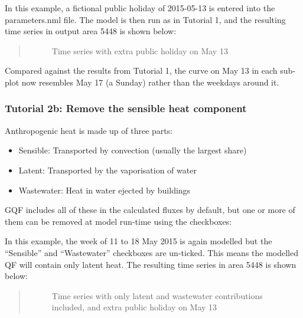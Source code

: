\documentclass[letterpaper,10pt,english]{sphinxmanual}
\begin{document}
In this example, a fictional public holiday of 2015-05-13 is entered
into the parameters.nml file. The model is then run as in Tutorial 1,
and the resulting time series in output area 5448 is shown below:
\begin{quote}

\begin{figure}[htbp]
\centering
\capstart

\noindent{}
\caption{Time series with extra public holiday on May 13}\label{\detokenize{Tutorials/GQF:id9}}\end{figure}
\end{quote}

Compared against the results from Tutorial 1, the curve on May 13 in
each sub-plot now resembles May 17 (a Sunday) rather than the weekdays
around it.


\subsubsection{Tutorial 2b: Remove the sensible heat component}
\label{\detokenize{Tutorials/GQF:tutorial-2b-remove-the-sensible-heat-component}}
Anthropogenic heat is made up of three parts:
\begin{itemize}
\item {} 
Sensible: Transported by convection (usually the largest share)

\item {} 
Latent: Transported by the vaporisation of water

\item {} 
Wastewater: Heat in water ejected by buildings

\end{itemize}

GQF includes all of these in the calculated fluxes by default, but one
or more of them can be removed at model run-time using the checkboxes:

In this example, the week of 11 to 18 May 2015 is again modelled but the
“Sensible” and “Wastewater” checkboxes are un-ticked. This means the
modelled QF will contain only latent heat. The resulting time series in
area 5448 is shown below:
\begin{quote}

\begin{figure}[htbp]
\centering
\capstart

\noindent{}
\caption{Time series with only latent and wastewater contributions included, and extra public holiday on May 13}\label{\detokenize{Tutorials/GQF:id10}}\end{figure}
\end{quote}
\end{document}
